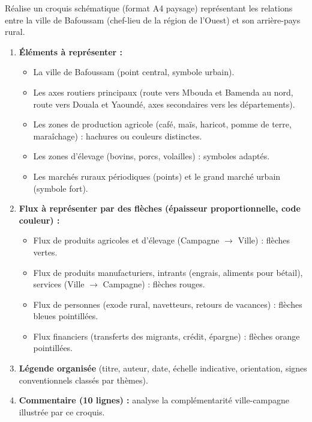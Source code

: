 \documentclass[11pt]{article}
\begin{document}
\begin{exercice}
Réalise un croquis schématique (format A4 paysage) représentant les relations entre la ville de Bafoussam (chef-lieu de la région de l'Ouest) et son arrière-pays rural.
\begin{enumerate}
\item \textbf{Éléments à représenter :}
\begin{itemize}
\item La ville de Bafoussam (point central, symbole urbain).
\item Les axes routiers principaux (route vers Mbouda et Bamenda au nord, route vers Douala et Yaoundé, axes secondaires vers les départements).
\item Les zones de production agricole (café, maïs, haricot, pomme de terre, maraîchage) : hachures ou couleurs distinctes.
\item Les zones d'élevage (bovins, porcs, volailles) : symboles adaptés.
\item Les marchés ruraux périodiques (points) et le grand marché urbain (symbole fort).
\end{itemize}
\item \textbf{Flux à représenter par des flèches (épaisseur proportionnelle, code couleur) :}
\begin{itemize}
\item Flux de produits agricoles et d'élevage (Campagne $\to$ Ville) : flèches vertes.
\item Flux de produits manufacturiers, intrants (engrais, aliments pour bétail), services (Ville $\to$ Campagne) : flèches rouges.
\item Flux de personnes (exode rural, navetteurs, retours de vacances) : flèches bleues pointillées.
\item Flux financiers (transferts des migrants, crédit, épargne) : flèches orange pointillées.
\end{itemize}
\item \textbf{Légende organisée} (titre, auteur, date, échelle indicative, orientation, signes conventionnels classés par thèmes).
\item \textbf{Commentaire (10 lignes) :} analyse la complémentarité ville-campagne illustrée par ce croquis.
\end{enumerate}
\end{exercice}
\end{document}
